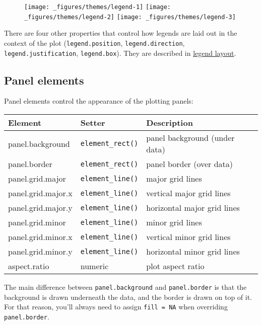 \begin{figure}[H]
  \texttt{[image: \_figures/themes/legend-1]}%
  \texttt{[image: \_figures/themes/legend-2]}%
  \texttt{[image: \_figures/themes/legend-3]}
\end{figure}

There are four other properties that control how legends are laid out in
the context of the plot (\texttt{legend.position},
\texttt{legend.direction}, \texttt{legend.justification},
\texttt{legend.box}). They are described in
\protect\hyperlink{sub:legend-layout}{legend layout}.

\subsection{Panel elements}

 

Panel elements control the appearance of the plotting panels:

\begin{longtable}[c]{@{}lll@{}}
\toprule
Element & Setter & Description\tabularnewline
\midrule
\endhead
panel.background & \texttt{element\_rect()} & panel background (under
data)\tabularnewline
panel.border & \texttt{element\_rect()} & panel border (over
data)\tabularnewline
panel.grid.major & \texttt{element\_line()} & major grid
lines\tabularnewline
panel.grid.major.x & \texttt{element\_line()} & vertical major grid
lines\tabularnewline
panel.grid.major.y & \texttt{element\_line()} & horizontal major grid
lines\tabularnewline
panel.grid.minor & \texttt{element\_line()} & minor grid
lines\tabularnewline
panel.grid.minor.x & \texttt{element\_line()} & vertical minor grid
lines\tabularnewline
panel.grid.minor.y & \texttt{element\_line()} & horizontal minor grid
lines\tabularnewline
aspect.ratio & numeric & plot aspect ratio\tabularnewline
\bottomrule
\end{longtable}

The main difference between \texttt{panel.background} and
\texttt{panel.border} is that the background is drawn underneath the
data, and the border is drawn on top of it. For that reason, you'll
always need to assign \texttt{fill\ =\ NA} when overriding
\texttt{panel.border}.

